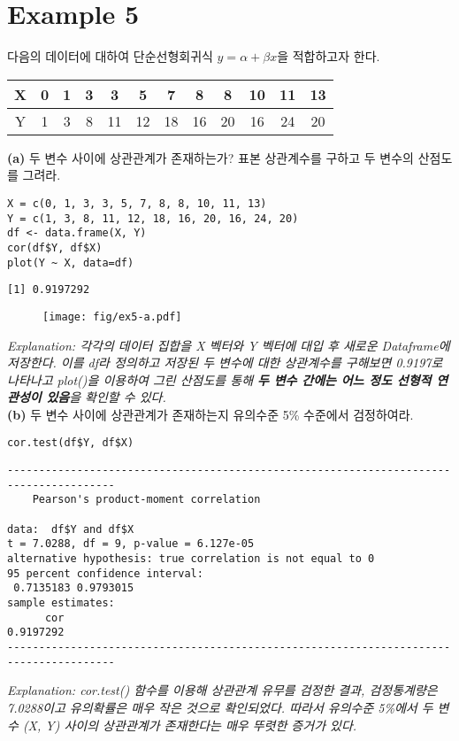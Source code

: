 \documentclass{article}
\begin{document}
\section*{Example 5}
다음의 데이터에 대하여 단순선형회귀식 $y=\alpha+\beta x$을 적합하고자 한다.

\begin{table}[htb!]
\centering
\begin{tabular}{|c|ccccccccccc|}
\hline
X & 0 & 1 & 3 & 3 & 5 & 7 & 8 & 8 & 10 & 11 & 13 \\ \hline
Y & 1 & 3 & 8 & 11 & 12 & 18 & 16 & 20 & 16 & 24 & 20 \\ \hline
\end{tabular}
\end{table}

\textbf{(a)} 두 변수 사이에 상관관계가 존재하는가? 표본 상관계수를 구하고 두 변수의 산점도를 그려라.
\begin{lstlisting}[style={r-style}]
X = c(0, 1, 3, 3, 5, 7, 8, 8, 10, 11, 13)
Y = c(1, 3, 8, 11, 12, 18, 16, 20, 16, 24, 20) 
df <- data.frame(X, Y)
cor(df$Y, df$X)
plot(Y ~ X, data=df)
\end{lstlisting}
\begin{lstlisting}[style={out-style}]
[1] 0.9197292
\end{lstlisting}
\begin{figure}[htb!]
    \centering
    \texttt{[image: fig/ex5-a.pdf]}
\end{figure}
\emph{Explanation: 각각의 데이터 집합을 X 벡터와 Y 벡터에 대입 후 새로운 Dataframe에 저장한다. 이를 df라 정의하고 저장된 두 변수에 대한 상관계수를 구해보면 0.9197로 나타나고 plot()을 이용하여 그린 산점도를 통해 \textbf{두 변수 간에는 어느 정도 선형적 연관성이 있음}을 확인할 수 있다. } \\

\textbf{(b)} 두 변수 사이에 상관관계가 존재하는지 유의수준 5\% 수준에서 검정하여라.
\begin{lstlisting}[style={r-style}]
cor.test(df$Y, df$X)
\end{lstlisting}
\begin{lstlisting}[style={out-style}]
---------------------------------------------------------------------------------------
	Pearson's product-moment correlation

data:  df$Y and df$X
t = 7.0288, df = 9, p-value = 6.127e-05
alternative hypothesis: true correlation is not equal to 0
95 percent confidence interval:
 0.7135183 0.9793015
sample estimates:
      cor 
0.9197292 
---------------------------------------------------------------------------------------
\end{lstlisting}
\emph{Explanation: cor.test() 함수를 이용해 상관관계 유무를 검정한 결과, 검정통계량은 7.0288이고 유의확률은 매우 작은 것으로 확인되었다. 따라서 유의수준 5\%에서 두 변수 (X, Y) 사이의 상관관계가 존재한다는 매우 뚜렷한 증거가 있다.} \\
\end{document}
